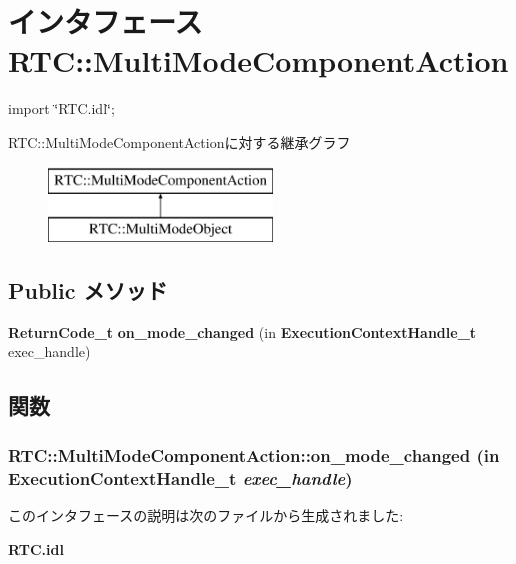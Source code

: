 \section{インタフェース RTC::MultiModeComponentAction}
\label{interfaceRTC_1_1MultiModeComponentAction}


{\ttfamily import \char`\"{}RTC.idl\char`\"{};}

RTC::MultiModeComponentActionに対する継承グラフ\begin{figure}[H]
\begin{center}
\leavevmode
\includegraphics[height=2cm]{interfaceRTC_1_1MultiModeComponentAction}
\end{center}
\end{figure}
\subsection*{Public メソッド}
\begin{DoxyCompactItemize}
\item 
{\bf ReturnCode\_\-t} {\bf on\_\-mode\_\-changed} (in {\bf ExecutionContextHandle\_\-t} exec\_\-handle)
\end{DoxyCompactItemize}


\subsection{関数}
\subsubsection[{on\_\-mode\_\-changed}]{ RTC::MultiModeComponentAction::on\_\-mode\_\-changed (in {\bf ExecutionContextHandle\_\-t} {\em exec\_\-handle})}\label{interfaceRTC_1_1MultiModeComponentAction_a0918cd39b3bfc001681ca40505304d7b}


このインタフェースの説明は次のファイルから生成されました:\begin{DoxyCompactItemize}
\item 
{\bf RTC.idl}\end{DoxyCompactItemize}
